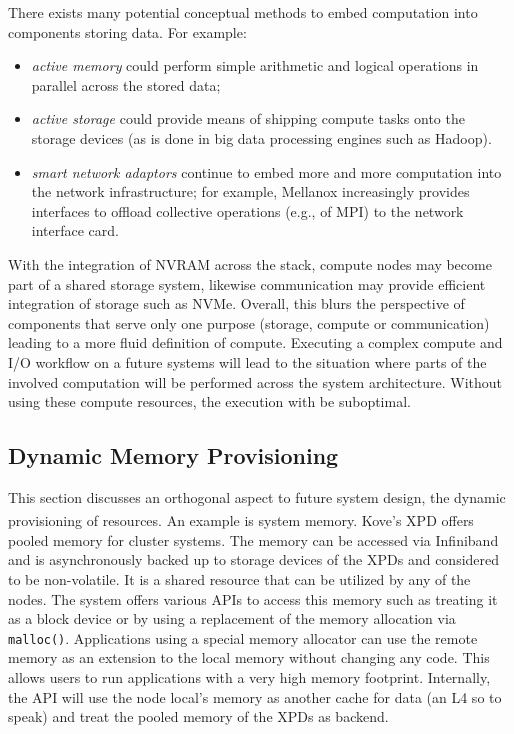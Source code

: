 \documentclass{../../template/esiwace-report}
\begin{document}
There exists many potential conceptual methods to embed computation into components storing data. For example:
\begin{itemize}
\item \textit{active memory} could perform simple arithmetic and logical operations in parallel across the stored data;
\item \textit{active storage} could provide means of shipping compute tasks onto the storage devices (as is done in big data processing engines such as Hadoop).
\item \textit{smart network adaptors} continue to embed more and more computation into the network infrastructure; for example, Mellanox increasingly provides interfaces to offload collective operations (e.g., of MPI) to the network interface card.
\end{itemize}
With the integration of NVRAM across the stack, compute nodes may become part of a shared storage system, likewise communication may provide efficient integration of storage such as NVMe. Overall, this blurs the perspective of components that serve only one purpose (storage, compute or  communication) leading to a more fluid definition of compute. Executing a complex compute and I/O workflow on a future systems will lead to the situation where parts of the involved computation will be performed across the system architecture.
Without using these compute resources, the execution with be suboptimal.

\subsection{Dynamic Memory Provisioning}

This section discusses an orthogonal aspect to future system design, the dynamic provisioning of resources.
An example is system memory.
Kove\textsuperscript{\textregistered}'s XPD\textsuperscript{\textregistered} offers pooled memory for cluster systems\cite{kove_about_2015}.
The memory can be accessed via Infiniband and is asynchronously backed up to storage devices of the XPDs and considered to be non-volatile.
It is a shared resource that can be utilized by any of the nodes.
The system offers various APIs to access this memory such as treating it as a block device or by using a replacement of the memory allocation via \texttt{malloc()}.
Applications using a special memory allocator can use the remote memory as an extension to the local memory without changing any code.
This allows users to run applications with a very high memory footprint.
Internally, the API will use the node local's memory as another cache for data (an L4 so to speak) and treat the pooled memory of the XPDs as backend.
\end{document}
